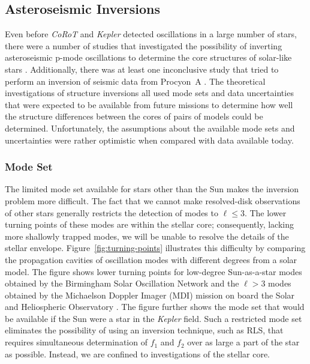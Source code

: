 \subsection{Asteroseismic Inversions} 
\label{sec:asteroseismic-inversions}

Even before {\it CoRoT} and {\it Kepler} detected oscillations in a large number of stars, there were a number of studies that investigated the possibility of inverting asteroseismic p-mode oscillations to determine the core structures of solar-like stars \citep{1993ASPC...40..541G,
1998mons.proc...33G, 2001ESASP.464..411B, 2001ESASP.464..407B,
2002ESASP.485..249B, 2003Ap&SS.284..153B}. 
Additionally, there was at least one inconclusive study that tried to perform an inversion of seismic data from Procyon~A \citep{2004ESASP.559..186D}. 
The theoretical investigations of structure inversions all used mode sets and data uncertainties that were expected to be available from future missions to determine how well the structure differences between the cores of pairs of models could be determined. 
Unfortunately, the assumptions about the available mode sets and uncertainties were rather optimistic when compared with data available today. 


\subsubsection*{Mode Set}
The limited mode set available for stars other than the Sun makes the inversion problem more difficult. 
The fact that we cannot make resolved-disk observations of other stars generally restricts the detection of modes to ${\ell \le 3}$. 
The lower turning points of these modes are within the stellar core; consequently, lacking more shallowly trapped modes, we will be unable to resolve the details of the stellar envelope. 
Figure~\ref{fig:turning-points} illustrates this difficulty by comparing the propagation cavities of oscillation modes with different degrees from a solar model. 
The figure shows lower turning points for low-degree Sun-as-a-star modes obtained by the Birmingham Solar Oscillation Network \citep[BiSON;][]{2014MNRAS.439.2025D} and the ${\ell > 3}$ modes obtained by the Michaelson Doppler Imager (MDI) mission on board the Solar and Heliospheric Observatory \citep[SOHO,][]{1997SoPh..175..287R}. 
The figure further shows the mode set that would be available if the Sun were a star in the {\it Kepler} field. 
Such a restricted mode set eliminates the possibility of using an inversion technique, such as RLS, that requires simultaneous determination of $f_1$ and $f_2$ over as large a part of the star as possible. 
Instead, we are confined to investigations of the stellar core. 


